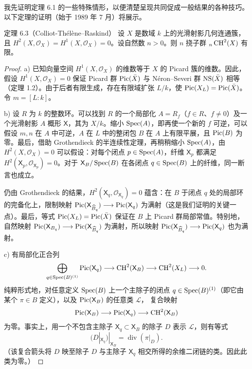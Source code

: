 我先证明定理 6.1 的一些特殊情形，以便清楚呈现共同促成一般结果的各种技巧。以下定理的证明（始于 1989 年 7 月）将展示。
\begin{statement}{定理 6.3（Colliot-Thélène--Raskind）}
设 $X$ 是数域 $k$ 上的光滑射影几何连通簇，且 $H^2(X,\mathcal O_X)=H^1(X,\mathcal O_X)=0$。设自然数 $n>0$。则 $n$ 挠子群 ${}_n\operatorname{CH}^2(X)$ 有限。
\end{statement}
\begin{proof}
a) 已知向量空间 $H^1(X,\mathcal O_X)$ 的维数等于 $X$ 的 Picard 簇的维数。因此，假设 $H^1(X,\mathcal O_X)=0$ 保证 Picard 群 $\operatorname{Pic}(\bar X)$ 与 Néron--Severi 群 $\operatorname{NS}(\bar X)$ 相等（定理 1.2）。由于后者有限生成，存在有限域扩张 $L/k$，使 $\operatorname{Pic}(X_L)=\operatorname{Pic}(\bar X)$。令 $m=[L:k]$。

b) 设 $R$ 为 $k$ 的整数环。可以找到 $R$ 的一个局部化 $A=R_f$（$f\in R$、$f\ne0$）及一个光滑射影 $A$ 概形 $\mathsf X$，其为 $X/k$。缩小 $\operatorname{Spec}(A)$，即再使一个新的 $f$ 可逆，可以假设 $m,n$ 在 $A$ 中可逆，$A$ 在 $L$ 中的整闭包 $B$ 在 $A$ 上有限平展，且 $\operatorname{Pic}(B)$ 为零。最后，借助 Grothendieck 的半连续性定理，再稍稍缩小 $\operatorname{Spec}(A)$，由 $H^2(X,\mathcal O_X)=0$ 可以假设：对每个闭点 $p\in\operatorname{Spec}(A)$，纤维 $\mathsf X_p$ 都满足 $H^2(\mathsf X_p,\mathcal O_{\mathsf X_p})=0$。对于 $\mathsf X_B/\operatorname{Spec}(B)$ 在各闭点 $q\in\operatorname{Spec}(B)$ 上的纤维，同一断言也成立。

仍由 Grothendieck 的结果，$H^2(\mathsf X_q,\mathcal O_{\mathsf X_q})=0$ 蕴含：在 $B$ 于闭点 $q$ 处的局部环的完备化上，限制映射 $\operatorname{Pic}(\mathsf X_{\widehat B_q})\longrightarrow\operatorname{Pic}(\mathsf X_q)$ 为满射（这是我们证明的关键一点）。最后，等式 $\operatorname{Pic}(X_L)=\operatorname{Pic}(\bar X)$ 保证在 $B$ 上 Picard 群局部常值。特别地，自然映射 $\operatorname{Pic}(\mathsf X_{B_q})\longrightarrow\operatorname{Pic}(\mathsf X_{\widehat B_q})$ 为满射，所以映射 $\operatorname{Pic}(\mathsf X_{\widehat B_q})\longrightarrow\operatorname{Pic}(\mathsf X_q)$ 也为满射。

c) 有局部化正合列
\[
\bigoplus_{q\in\operatorname{Spec}(B)^{(1)}}\operatorname{Pic}(\mathsf X_q)\longrightarrow\operatorname{CH}^2(\mathsf X_B)\longrightarrow\operatorname{CH}^2(X_L)\longrightarrow0.
\]
纯粹形式地，对任意定义 $\operatorname{Spec}(B)$ 上一个主除子的闭点 $q\in\operatorname{Spec}(B)^{(1)}$（即它由某个 $\pi\in B$ 定义），以及 $\operatorname{Pic}(\mathsf X_B)$ 的任意类 $\mathcal L$，
复合映射
\[
\operatorname{Pic}(\mathsf X_B)\longrightarrow\operatorname{Pic}(\mathsf X_q)\longrightarrow\operatorname{CH}^2(\mathsf X_B)
\]
为零。事实上，用一个不包含主除子 $\mathsf X_q\subset\mathsf X_B$ 的除子 $D$ 表示 $\mathcal L$，则有等式
\[
(D|_{\mathsf X_q})|_{\mathsf X_B}=\operatorname{div}(\pi|_D).
\]
（该复合箭头将 $D$ 映至除子 $D$ 与主除子 $\mathsf X_q$ 相交所得的余维二闭链的类。因此此类为零。）


\end{proof}
